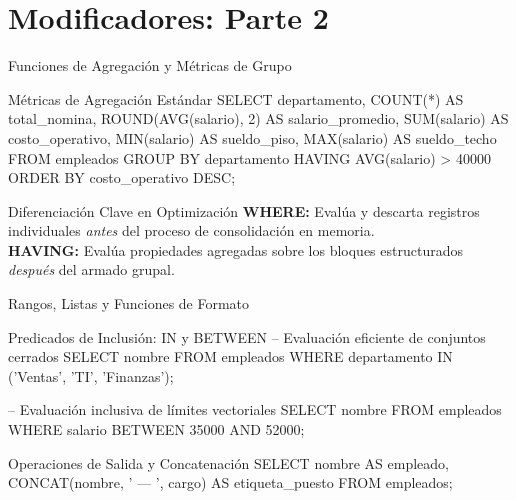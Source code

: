 \documentclass[12pt, aspectratio=169, UTF8]{beamer}
\begin{document}
\section{Modificadores: Parte 2}

\begin{frame}[fragile]{Funciones de Agregación y Métricas de Grupo}
  \begin{sqlbox}{Métricas de Agregación Estándar}
SELECT departamento,
       COUNT(*) AS total_nomina,
       ROUND(AVG(salario), 2) AS salario_promedio,
       SUM(salario) AS costo_operativo,
       MIN(salario) AS sueldo_piso,
       MAX(salario) AS sueldo_techo
FROM empleados
GROUP BY departamento
HAVING AVG(salario) > 40000
ORDER BY costo_operativo DESC;
  \end{sqlbox}
  \begin{exampleblock}{Diferenciación Clave en Optimización}
    \textbf{WHERE:} Evalúa y descarta registros individuales \textit{antes} del proceso de consolidación en memoria.\\
    \textbf{HAVING:} Evalúa propiedades agregadas sobre los bloques estructurados \textit{después} del armado grupal.
  \end{exampleblock}
\end{frame}

\begin{frame}[fragile]{Rangos, Listas y Funciones de Formato}
  \begin{sqlbox}{Predicados de Inclusión: IN y BETWEEN}
-- Evaluación eficiente de conjuntos cerrados
SELECT nombre FROM empleados WHERE departamento IN ('Ventas', 'TI', 'Finanzas');

-- Evaluación inclusiva de límites vectoriales
SELECT nombre FROM empleados WHERE salario BETWEEN 35000 AND 52000;
  \end{sqlbox}
  \vspace{4pt}
  \begin{sqlbox}{Operaciones de Salida y Concatenación}
SELECT nombre AS empleado,
       CONCAT(nombre, ' — ', cargo) AS etiqueta_puesto
FROM empleados;
  \end{sqlbox}
\end{frame}
\end{document}
